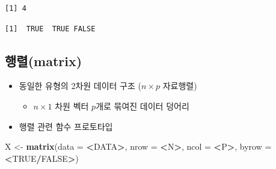 \documentclass[11pt,a4paper]{book}
\newenvironment{Shaded}{\begin{snugshade}}{\end{snugshade}}
\newcommand{\KeywordTok}[1]{\textcolor[rgb]{0.13,0.29,0.53}{\textbf{#1}}}
\newcommand{\DataTypeTok}[1]{\textcolor[rgb]{0.13,0.29,0.53}{#1}}
\newcommand{\StringTok}[1]{\textcolor[rgb]{0.31,0.60,0.02}{#1}}
\newcommand{\CommentTok}[1]{\textcolor[rgb]{0.56,0.35,0.01}{\textit{#1}}}
\newcommand{\OtherTok}[1]{\textcolor[rgb]{0.56,0.35,0.01}{#1}}
\newcommand{\OperatorTok}[1]{\textcolor[rgb]{0.81,0.36,0.00}{\textbf{#1}}}
\newcommand{\NormalTok}[1]{#1}
\providecommand{\tightlist}{%
  \setlength{\itemsep}{0pt}\setlength{\parskip}{0pt}}
\theoremstyle{definition}
\theoremstyle{definition}
\theoremstyle{definition}
\theoremstyle{remark}
\begin{document}
\begin{verbatim}
[1] 4
\end{verbatim}

\begin{Shaded}
\end{Shaded}

\begin{verbatim}
[1]  TRUE  TRUE FALSE
\end{verbatim}

\normalsize

\subsection{행렬(matrix)}\label{matrix}

\begin{itemize}
\tightlist
\item
  동일한 유형의 2차원 데이터 구조 (\(n \times p\) 자료행렬)

  \begin{itemize}
  \tightlist
  \item
    \(n \times 1\) 차원 벡터 \(p\)개로 묶여진 데이터 덩어리
  \end{itemize}
\item
  행렬 관련 함수 프로토타입
\end{itemize}

\footnotesize

\begin{Shaded}
\begin{Highlighting}[]
\NormalTok{X <-}\StringTok{ }\KeywordTok{matrix}\NormalTok{(}\DataTypeTok{data =} \OperatorTok{<}\NormalTok{DATA}\OperatorTok{>}\NormalTok{, }\DataTypeTok{nrow =} \OperatorTok{<}\NormalTok{N}\OperatorTok{>}\NormalTok{, }\DataTypeTok{ncol =} \OperatorTok{<}\NormalTok{P}\OperatorTok{>}\NormalTok{, }\DataTypeTok{byrow =} \OperatorTok{<}\OtherTok{TRUE}\OperatorTok{/}\OtherTok{FALSE}\OperatorTok{>}\NormalTok{)}
\end{Highlighting}
\end{Shaded}

\normalsize
\end{document}
